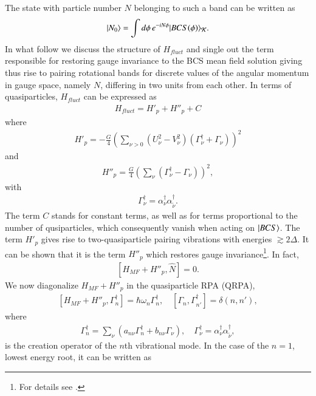 The state with particle number $N$ belonging to such a band can be written as
\begin{align}\label{eq1.4.56}
|{N_0} \rangle=\int d\phi\, e^{-iN\phi}|{BCS(\phi)} \rangle_{\mathcal K}.
\end{align}
In what follow we  discuss the structure of $H_{fluct}$ and single out the term responsible for restoring gauge invariance to the BCS mean field solution giving thus rise to pairing rotational bands for discrete values of the angular momentum in gauge space, namely $N$, differing in two units from each other. In terms of quasiparticles, $H_{fluct}$ can be expressed  as
\begin{align}\label{eq0.1.91}
H_{fluct}=H'_p+H''_p+C
\end{align}
where 
\begin{align}\label{eq0.1.92}
H'_p=-\frac{G}{4}\left(\sum_{\nu>0}\left(U^2_\nu-V^2_\nu\right)\left(\Gamma^\dagger_\nu+\Gamma_\nu\right)\right)^2
\end{align}
and
\begin{align}\label{eq0.1.93}
H''_p=\frac{G}{4}\left(\sum_{\nu}\left(\Gamma^\dagger_\nu-\Gamma_\nu\right)\right)^2,
\end{align}
with
\begin{align}\label{eq0.1.94}
\Gamma^\dagger_\nu=\alpha^\dagger_\nu\alpha_{\tilde \nu}^\dagger.
\end{align}
The term $C$ stands for constant terms, as well as for terms proportional to the number of qusiparticles, which consequently vanish when acting on $|{BCS} \rangle$. The term $H'_p$ gives rise to two-quasiparticle pairing vibrations with energies $\gtrsim2\Delta$. It can be shown that it is the term $H''_p$ which restores gauge invariance\footnote{For details see \cite{Brink:05}.}. In fact,
\begin{align}\label{eq0.1.95}
\left[H_{MF}+H''_p,\hat N\right]=0.
\end{align}
We now diagonalize $H_{MF}+H''_p$ in the quasiparticle RPA (QRPA),
\begin{align}\label{eq0.1.96}
\left[H_{MF}+H''_p,\Gamma^\dagger_n\right]=\hbar\omega_n\Gamma^\dagger_n,\quad \left[\Gamma_n,\Gamma^\dagger_{n'}\right]=\delta(n,n'),
\end{align}
where
\begin{align}\label{eq0.1.97}
\Gamma^\dagger_n=\sum_{\nu}\left(a_{n\nu}\Gamma^\dagger_n+b_{n\nu}\Gamma_\nu\right),\quad \Gamma^\dagger_\nu=\alpha^\dagger_\nu\alpha^\dagger_{\tilde\nu},	
\end{align}
is the creation operator of the $n$th vibrational mode. In the case of the $n=1$, lowest energy root, it can be written as
